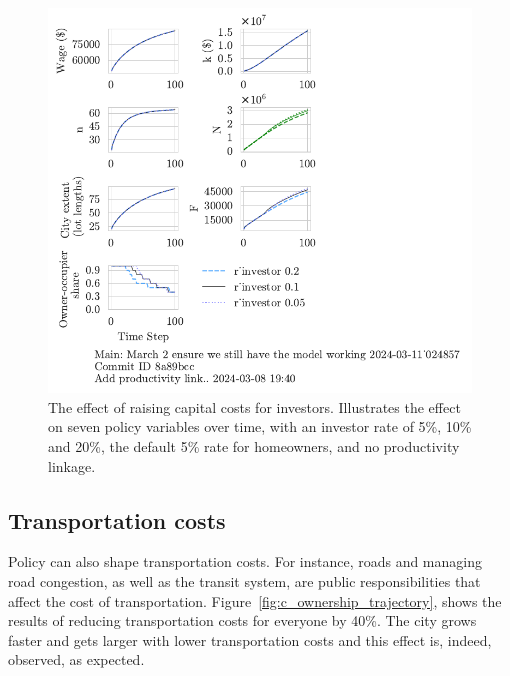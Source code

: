 \begin{figure}[h!b]
    \centering
    \includegraphics[scale=1., trim={0 1.4cm 0 0},clip]{fig/r_investor-Main-024857.pdf}
    \caption[The effect of raising capital costs for investors]{The effect of raising capital costs for investors. Illustrates the effect on seven policy variables over time, with an investor rate of 5\%, 10\% and 20\%, the {\color{red} default 5\% rate for homeowners}, and no productivity linkage.}
    \label{fig:capital_ownership_trajectory}
\end{figure}

\newpage
\subsection{Transportation costs}
Policy can also shape transportation costs. For instance, roads and managing road congestion, as well as the transit system, are public responsibilities that affect the cost of transportation. %
Figure~\ref{fig:c_ownership_trajectory}, shows the results of reducing transportation costs for everyone by 40\%. 
The city grows faster and gets larger with lower transportation costs and this effect is, indeed, observed, as expected. %


